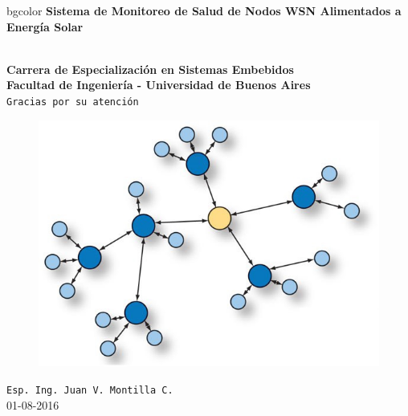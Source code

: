 \documentclass[aspectratio=43, handout]{beamer}
\begin{document}
\begingroup
\makeatletter
\setlength{\hoffset}{-.5\beamer@sidebarwidth}
\makeatother
\begin{frame}
\begin{center}
\hfill
    \begin{beamercolorbox}[center,dp=3ex,ht=10.25ex, wd=1\linewidth]{bgcolor}
        \Large\textbf{Sistema de Monitoreo de Salud de Nodos WSN Alimentados a Energía Solar}\\
    \end{beamercolorbox}
\hfill\hfill
\\
\vspace{5px}
\textbf{Carrera de Especialización en Sistemas Embebidos}\\
\textbf{Facultad de Ingeniería - Universidad de Buenos Aires}\\
\vspace{10px}
\texttt{Gracias por su atención}\\

\vspace{10px}

\begin{figure}[H]
	\includegraphics[width=.3\textwidth]{./imagenes/red.jpg}
\end{figure}	
\vspace{10px}
\texttt{Esp. Ing. Juan V. Montilla C.}\\

\vspace{5px}
\tiny 01-08-2016 
 	  	
\end{center}
\end{frame}
\endgroup
\end{document}
